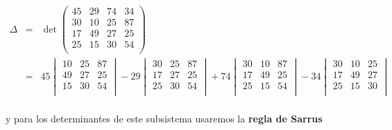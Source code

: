 \documentclass[12pt, landscape]{article}
\begin{document}
	\begin{eqnarray*}
		\Delta &=& \det \begin{pmatrix}
						45 & 29 & 74 & 34 \\
						30 & 10 & 25 & 87 \\
						17 & 49 & 27 & 25 \\
						25 & 15 & 30 & 54 \\
					\end{pmatrix} \\
				&=& 45 \begin{vmatrix}
						10 & 25 & 87 \\
						49 & 27 & 25 \\
						15 & 30 & 54 \\
					\end{vmatrix}
					 - 29 \begin{vmatrix}
							30 & 25 & 87 \\
							17 & 27 & 25 \\
							25 & 30 & 54 \\
						\end{vmatrix}
					 + 74 \begin{vmatrix}
							30 & 10 & 87 \\
							17 & 49 & 25 \\
							25 & 15 & 54 \\
						\end{vmatrix}
					 - 34 \begin{vmatrix}
							30 & 10 & 25  \\
							17 & 49 & 27  \\
							25 & 15 & 30  \\
						\end{vmatrix} \\
	\end{eqnarray*}
	
	y para los determinantes de este subsistema usaremos la \textbf{regla de Sarrus}
	
\end{document}
